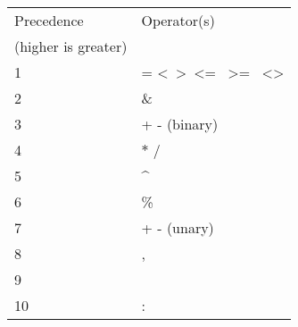 \begin{tabular}{ll}
\toprule
Precedence & Operator(s) \\
(higher is greater) & \\
\midrule
1 & = \textless \  \textgreater \  \textless= \  \textgreater= \  \textless\textgreater          \\
2 & \&  \\
3 & + - (binary) \\
4 & $\ast$ / \\
5 & \textasciicircum \\
6 & \% \\
7 & + - (unary) \\
8 & , \\
9 & \texttt{\char32} \\
10 & : \\
\bottomrule
\end{tabular}